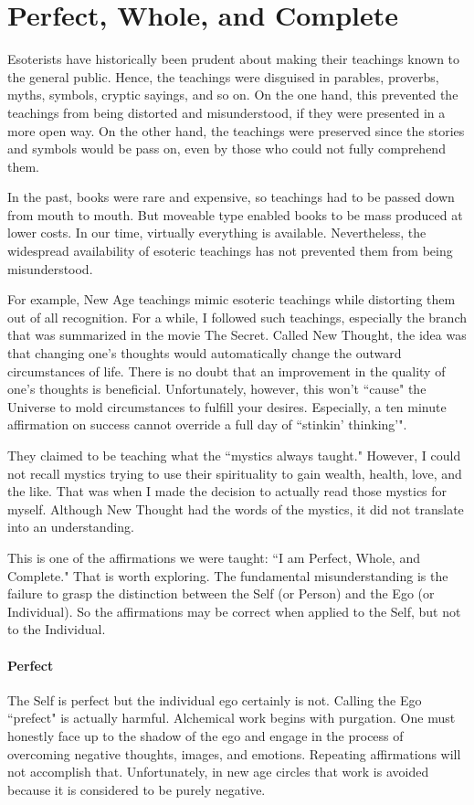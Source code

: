 \section{Perfect, Whole, and Complete}

Esoterists have historically been prudent about making their teachings known to the general public. Hence, the teachings were disguised in parables, proverbs, myths, symbols, cryptic sayings, and so on. On the one hand, this prevented the teachings from being distorted and misunderstood, if they were presented in a more open way. On the other hand, the teachings were preserved since the stories and symbols would be pass on, even by those who could not fully comprehend them.

In the past, books were rare and expensive, so teachings had to be passed down from mouth to mouth. But moveable type enabled books to be mass produced at lower costs. In our time, virtually everything is available. Nevertheless, the widespread availability of esoteric teachings has not prevented them from being misunderstood.

For example, New Age teachings mimic esoteric teachings while distorting them out of all recognition. For a while, I followed such teachings, especially the branch that was summarized in the movie The Secret. Called New Thought, the idea was that changing one's thoughts would automatically change the outward circumstances of life. There is no doubt that an improvement in the quality of one's thoughts is beneficial. Unfortunately, however, this won't ``cause" the Universe to mold circumstances to fulfill your desires. Especially, a ten minute affirmation on success cannot override a full day of ``stinkin' thinking'".

They claimed to be teaching what the ``mystics always taught." However, I could not recall mystics trying to use their spirituality to gain wealth, health, love, and the like. That was when I made the decision to actually read those mystics for myself. Although New Thought had the words of the mystics, it did not translate into an understanding.

This is one of the affirmations we were taught: ``I am Perfect, Whole, and Complete." That is worth exploring. The fundamental misunderstanding is the failure to grasp the distinction between the Self (or Person) and the Ego (or Individual). So the affirmations may be correct when applied to the Self, but not to the Individual.

\paragraph{Perfect}
The Self is perfect but the individual ego certainly is not. Calling the Ego ``prefect" is actually harmful. Alchemical work begins with purgation. One must honestly face up to the shadow of the ego and engage in the process of overcoming negative thoughts, images, and emotions. Repeating affirmations will not accomplish that. Unfortunately, in new age circles that work is avoided because it is considered to be purely negative.

